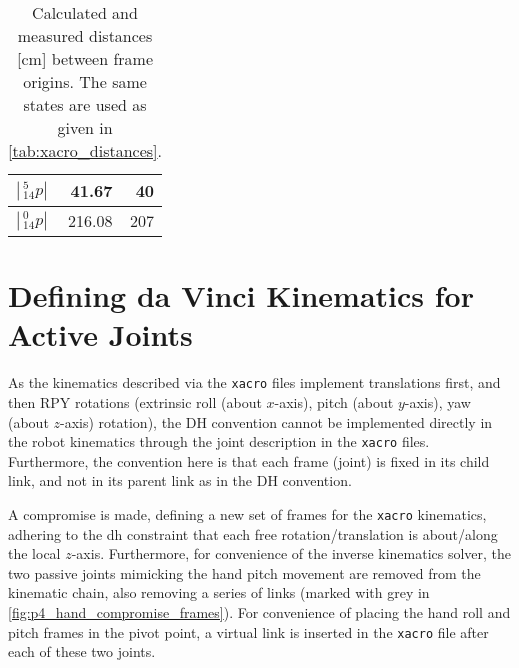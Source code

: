 \begin{table}[htbp]
{\begin{tabular}{l r r}
$|\,^5_{14} p|$ & 41.67 & 40\\\hline %
$|\,^0_{14} p|$ & 216.08 & 207
\end{tabular}
\label{tab:state7dh}%
}\hfill
\setlength{\tabcolsep}{6pt}
\caption{Calculated and measured distances [cm] between frame origins. The same states are used as given in \autoref{tab:xacro_distances}.}
\label{tab:DH_distances}
\end{table}



\section{Defining da Vinci Kinematics for Active Joints}\label{sec:app_activejoints_kinematics}
As the kinematics described via the \texttt{xacro} files implement translations first, and then RPY rotations (extrinsic roll (about $x$-axis), pitch (about $y$-axis), yaw (about $z$-axis) rotation), the DH convention cannot be implemented directly in the robot kinematics through the joint description in the \texttt{xacro} files. Furthermore, the convention here is that each frame (joint) is fixed in its child link, and not in its parent link as in the DH convention.

A compromise is made, defining a new set of frames for the \texttt{xacro} kinematics, adhering to the \gls{dh} constraint that each free rotation/translation is about/along the local $z$-axis. Furthermore, for convenience of the inverse kinematics solver, the two passive joints mimicking the hand pitch movement are removed from the kinematic chain, also removing a series of links (marked with grey in \autoref{fig:p4_hand_compromise_frames}). For convenience of placing the hand roll and pitch frames in the pivot point, a virtual link is inserted in the \texttt{xacro} file after each of these two joints. 

